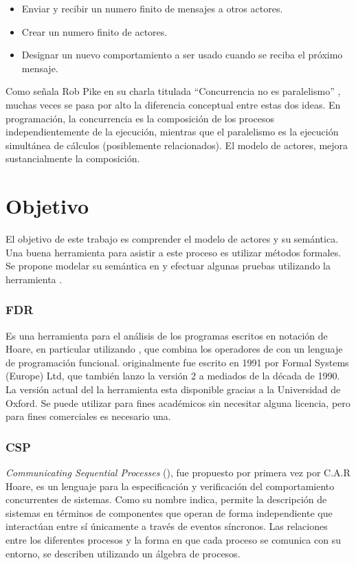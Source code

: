 \begin{itemize}
\item Enviar y recibir un numero finito de mensajes a otros actores.
\item Crear un numero finito de actores.
\item Designar un nuevo comportamiento a ser usado cuando se reciba el próximo mensaje.
\end{itemize}

Como señala Rob Pike en su charla titulada ``Concurrencia no es paralelismo'' \cite{rpike13_cnp}, muchas veces se pasa por alto la diferencia conceptual entre estas dos ideas. En programación, la concurrencia es la composición de los procesos independientemente de la ejecución, mientras que el paralelismo es la ejecución simultánea de cálculos (posiblemente relacionados). El modelo de actores, mejora sustancialmente la composición.

\section{Objetivo}
El objetivo de este trabajo es comprender el modelo de actores y su semántica. Una buena herramienta para asistir a este proceso es utilizar métodos formales. Se propone modelar su semántica en \CSP y efectuar algunas pruebas utilizando la herramienta \FDR\cite{fdr}.

\subsubsection*{FDR}

Es una herramienta para el análisis de los programas escritos en notación \CSP de Hoare, en particular utilizando \CSPm, que combina los operadores de \CSP con un lenguaje de programación funcional. \FDR originalmente fue escrito en 1991 por Formal Systems (Europe) Ltd, que también lanzo la versión 2 a mediados de la década de 1990. La versión actual del la herramienta esta disponible gracias a la Universidad de Oxford. Se puede utilizar para fines académicos sin necesitar alguna licencia, pero para fines comerciales es necesario una.

\subsubsection*{CSP}

\textit{Communicating Sequential Processes} (\CSP), fue propuesto por primera vez por C.A.R Hoare\cite{Hoare:1978:CSP:359576.359585}, es un lenguaje para la especificación y verificación del comportamiento concurrentes de sistemas. Como su nombre indica, \CSP permite la descripción de sistemas en términos de componentes que operan de forma independiente que interactúan entre sí únicamente a través de eventos síncronos. Las relaciones entre los diferentes procesos y la forma en que cada proceso se comunica con su entorno, se describen utilizando un álgebra de procesos.

